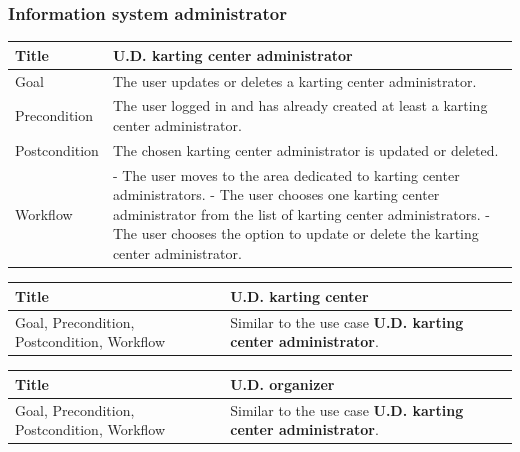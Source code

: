 \documentclass{beamer}
\begin{document}
\begin{frame}
    \frametitle{Information system administrator}
    \begin{table}
        \tiny
        \begin{tabular}{|p{2cm}|p{6cm}|}
        \hline  
        Title & \textbf{U.D. karting center administrator} \\
        \hline
        Goal & The user updates or deletes a karting center administrator. \\
        \hline
        Precondition & The user logged in and has already created at least a karting center
        administrator. \\
        \hline
        Postcondition & The chosen karting center administrator is updated or deleted. \\
        \hline
        Workflow &
        - The user moves to the area dedicated to karting center administrators. \newline
        - The user chooses one karting center administrator from the
        list of karting center administrators. \newline
        - The user chooses the option to update or delete the karting center administrator. \\
        \hline
        \end{tabular}
\end{table}

\begin{table}
    \tiny
    \begin{tabular}{|p{2cm}|p{6cm}|}
    \hline  
    Title & \textbf{U.D. karting center} \\
    \hline
    Goal, Precondition, Postcondition, Workflow & Similar 
    to the use case \textbf{U.D. karting center administrator}. \\
    \hline
    \end{tabular}
\end{table}

\begin{table}
    \tiny
    \begin{tabular}{|p{2cm}|p{6cm}|}
    \hline  
    Title & \textbf{U.D. organizer} \\
    \hline
    Goal, Precondition, Postcondition, Workflow & Similar 
    to the use case \textbf{U.D. karting center administrator}. \\
    \hline
    \end{tabular}
\end{table}

\end{frame}
\end{document}
